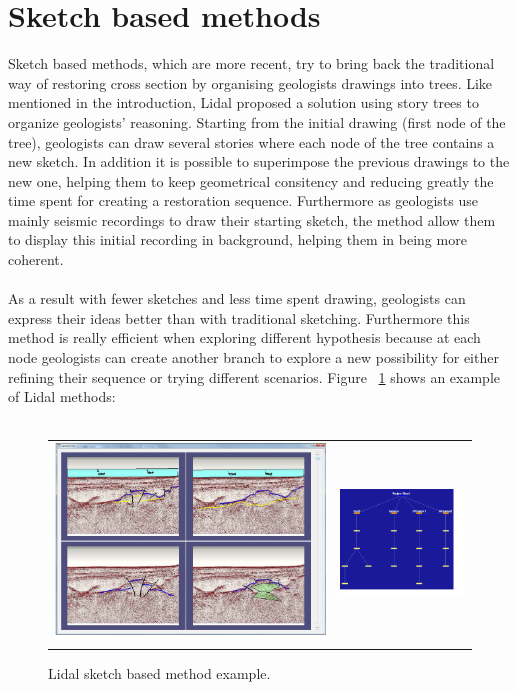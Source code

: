 \documentclass[12pt, a4paper]{report} %
\begin{document}
\section{Sketch based methods}

Sketch based methods, which are more recent, try to bring back the traditional way of restoring cross section by organising geologists drawings into trees.
Like mentioned in the introduction, Lidal \cite{lidal} proposed a solution using story trees to organize geologists' reasoning. Starting from the initial drawing (first node of the tree), geologists can draw several stories where each node of the tree contains a new sketch. In addition it is possible to superimpose the previous drawings to the new one, helping them to keep geometrical consitency and reducing greatly the time spent for creating a restoration sequence. Furthermore as geologists use mainly seismic recordings to draw their starting sketch, the method allow them to display this initial recording in background, helping them in being more coherent.\\\\
 As a result with fewer sketches and less time spent drawing, geologists can express their ideas better than with traditional sketching. Furthermore this method is really efficient when exploring different hypothesis because at each node geologists can create another branch to explore a new possibility for either refining their sequence or trying different scenarios. Figure ~\ref{lidal} shows an example of Lidal methods:\\\\
 \begin{figure}[H]
\centering
\begin{tabular}{@{}cc@{}}
\includegraphics[width=.45\textwidth]{lidal0.png}&
\includegraphics[width=.45\textwidth]{lidal1.png}\\
\end{tabular}
\caption{Lidal sketch based method example.}
\label{lidal}
\end{figure}
\end{document}
